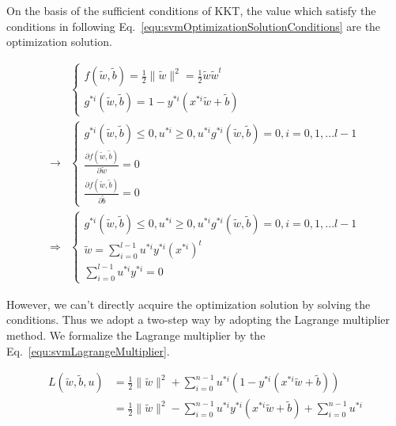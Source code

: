 \documentclass[runningheads,openany]{xhlPaper}
\begin{document}
On the basis of the sufficient conditions of KKT, the value which satisfy the conditions in following Eq.~\ref{equ:svmOptimizationSolutionConditions} are the optimization solution.

\begin{equation}
\label{equ:svmOptimizationSolutionConditions}
\begin{aligned}
&\left\{ {\begin{array}{*{20}{c}}
{f\left( {\tilde w,\tilde b} \right) = \frac{1}{2}\parallel \tilde w{\parallel ^2} = \frac{1}{2}\tilde w{{\tilde w}^t}}\\
{{g^{*i}}\left( {\tilde w,\tilde b} \right) = 1 - {y^{*i}}\left( {{x^{*i}}\tilde w + \tilde b} \right)}
\end{array}} \right.\\
 \to &\left\{ {\begin{array}{*{20}{c}}
{{g^{*i}}\left( {\tilde w,\tilde b} \right) \le 0,{u^{*i}} \ge 0,{u^{*i}}{g^{*i}}\left( {\tilde w,\tilde b} \right) = 0,i = 0,1,...l - 1}\\
{\frac{{\partial f\left( {\tilde w,\tilde b} \right)}}{{\partial \tilde w}} = 0}\\
{\frac{{\partial f\left( {\tilde w,\tilde b} \right)}}{{\partial \tilde b}} = 0}
\end{array}} \right.\\
 \Rightarrow &\left\{ {\begin{array}{*{20}{c}}
{{g^{*i}}\left( {\tilde w,\tilde b} \right) \le 0,{u^{*i}} \ge 0,{u^{*i}}{g^{*i}}\left( {\tilde w,\tilde b} \right) = 0,i = 0,1,...l - 1}\\
{\tilde w = \sum\limits_{i = 0}^{l - 1} {{u^{*i}}{y^{*i}}{{\left( {{x^{*i}}} \right)}^t}} }\\
{\sum\limits_{i = 0}^{l - 1} {{u^{*i}}{y^{*i}}}  = 0}
\end{array}} \right.
\end{aligned}
\end{equation}

However, we can't directly acquire the optimization solution by solving the conditions. Thus we adopt a two-step way by adopting the Lagrange multiplier method. We formalize the Lagrange multiplier by the Eq.~\ref{equ:svmLagrangeMultiplier}.

\begin{equation}
\label{equ:svmLagrangeMultiplier}
\begin{aligned}
L\left( {\tilde w,\tilde b,u} \right) &= \frac{1}{2}\parallel \tilde w{\parallel ^2} + \sum\limits_{i = 0}^{n - 1} {{u^{*i}}\left( {1 - {y^{*i}}\left( {{x^{*i}}\tilde w + \tilde b} \right)} \right)} \\
 &= \frac{1}{2}\parallel \tilde w{\parallel ^2} - \sum\limits_{i = 0}^{n - 1} {{u^{*i}}{y^{*i}}\left( {{x^{*i}}\tilde w + \tilde b} \right)}  + \sum\limits_{i = 0}^{n - 1} {{u^{*i}}} 
\end{aligned}
\end{equation}
\end{document}
